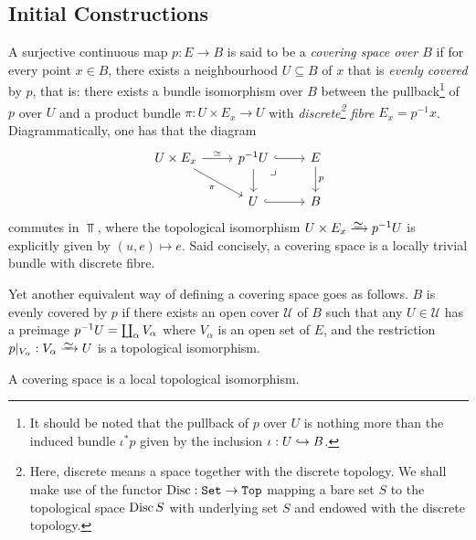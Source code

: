 \subsection{Initial Constructions}

\begin{definition}
    \label{def:covering-space}
    A surjective continuous map \(p: E \to B\) is said to be a \emph{covering space
        over \(B\)} if for every point \(x \in B\), there exists a neighbourhood
    \(U \subseteq B\) of \(x\) that is \emph{evenly covered} by \(p\), that is:
    there exists a bundle isomorphism over \(B\) between the pullback\footnote{It
        should be noted that the pullback of \(p\) over \(U\) is nothing more than the
        induced bundle \(\iota^{*} p\) given by the inclusion \(\iota: U \hookrightarrow B\).} of
    \(p\) over \(U\) and a product bundle \(\pi: U \times E_x \to U\) with
    \emph{discrete\footnote{Here, discrete means a space together with the discrete
            topology. We shall make use of the functor \(\operatorname{Disc}: {\texttt{Set}} \to {\texttt{Top}}\) mapping
            a bare set \(S\) to the topological space \(\operatorname{Disc} S\) with underlying set
            \(S\) and endowed with the discrete topology.} fibre}
    \(E_x = p^{-1} x\). Diagrammatically, one has that the diagram
    \[
        \begin{tikzcd}
            U \times E_x \ar[r, "\dis"] \ar[rd, "\pi"']
            &p^{-1} U \ar[r, hook] \ar[d]
            \ar[rd, "\lrcorner", phantom, very near start]
            &E \ar[d, "p"] \\
            &U \ar[r, hook] &B
        \end{tikzcd}
    \]
    commutes in \(\Top\), where the topological isomorphism
    \(U \times E_x \isoto p^{-1} U\) is explicitly given by \((u, e) \mapsto
    e\). Said concisely, a covering space is a locally trivial bundle with discrete
    fibre.

    Yet another equivalent way of defining a covering space goes as follows. \(B\) is
    evenly covered by \(p\) if there exists an open cover \(\mathcal{U}\) of \(B\)
    such that any \(U \in \mathcal{U}\) has a preimage \(p^{-1} U = \coprod_{\alpha}
    V_{\alpha}\) where \(V_{\alpha}\) is an open set of \(E\), and the restriction
    \(p|_{V_{\alpha}}: V_{\alpha} \isoto U\) is a topological isomorphism.
\end{definition}

\begin{corollary}
    \label{cor:covering-space-is-locally-top-iso}
    A covering space is a local topological isomorphism.
\end{corollary}

